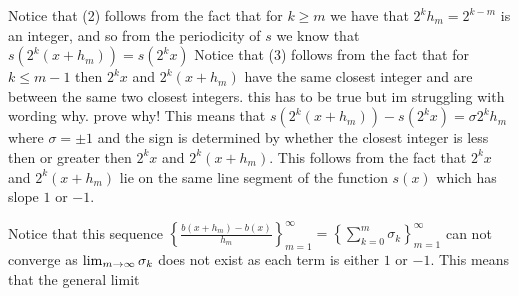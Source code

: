 \documentclass[12pt]{amsart}
\begin{document}
\begin{itemize}
      Notice that (2) follows from the fact that for $k\geq m$ we have that $2^kh_m=2^{k-m}$ is an integer, and so from the periodicity of $s$ we know that $s(2^k(x+h_m))=s(2^kx)$
      Notice that (3) follows from the fact that for $k\leq m-1$ then $2^{k}x$ and $2^{k}(x+h_m)$ have the same closest integer and are between the 
      same two closest integers. this has to be true but im struggling with wording why. prove why!
      This means that $s(2^k(x+h_m))-s(2^kx)=\sigma 2^kh_m$ where $\sigma=\pm 1$ and the sign is determined by whether the closest integer 
      is less then or greater then $2^{k}x$ and $2^{k}(x+h_m)$. This follows from the fact that $2^{k}x$ and $2^{k}(x+h_m)$ lie on the same 
      line segment of the function $s(x)$ which has slope $1$ or $-1$.

      Notice that this sequence $\left\{\frac{b(x+h_m)-b(x)}{h_m}\right\}_{m=1}^\infty=\left\{\sum_{k=0}^{m}\sigma_k\right\}_{m=1}^\infty$ can not converge as 
      $\lim_{m\rightarrow \infty} \sigma_k$ does not exist as each term is either $1$ or $-1$. This means that the general limit








\end{itemize}
\end{document}
